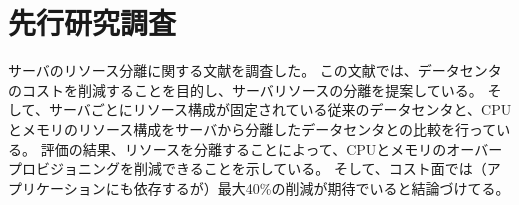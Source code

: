 \documentclass[a4j]{ujarticle}
\begin{document}
%

\section{先行研究調査}
  サーバのリソース分離に関する文献\cite{TechnoEconomicFrameworkforCloudInfrastructureACostStudyofResourceDisaggregation}を調査した。
  この文献では、データセンタのコストを削減することを目的し、サーバリソースの分離を提案している。
  そして、サーバごとにリソース構成が固定されている従来のデータセンタと、CPUとメモリのリソース構成をサーバから分離したデータセンタとの比較を行っている。
  評価の結果、リソースを分離することによって、CPUとメモリのオーバープロビジョニングを削減できることを示している。
  そして、コスト面では（アプリケーションにも依存するが）最大40\%の削減が期待でいると結論づけてる。
\end{document}
